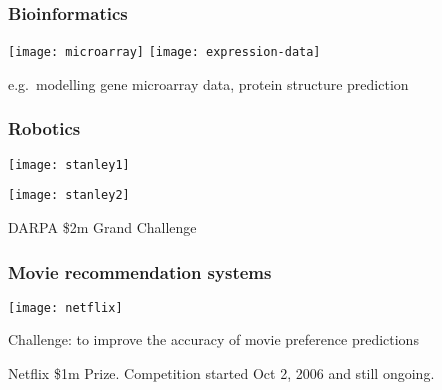 \begin{frame}
\frametitle{Bioinformatics}

\centerline{\texttt{[image: microarray]} \hspace{2ex}
\texttt{[image: expression-data]}}

\vspace{2ex}

e.g.\ modelling gene microarray data, protein structure prediction

\end{frame}
\begin{frame}
\frametitle{Robotics}

\centerline{\texttt{[image: stanley1]}}

\centerline{\texttt{[image: stanley2]}}

\vspace{2ex}

DARPA \$2m Grand Challenge

\end{frame}
\begin{frame}
\frametitle{Movie recommendation systems}

\centerline{\texttt{[image: netflix]}}

\vspace{1ex}

Challenge: to improve the accuracy of movie preference predictions
 
Netflix \$1m Prize. Competition started Oct 2, 2006 and still ongoing.\\ 

\end{frame}
